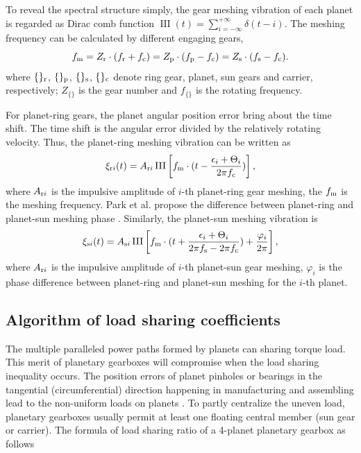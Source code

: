 \documentclass[a4paper,fleqn]{cas-sc}%
\begin{document}
\par To reveal the spectral structure simply, the gear meshing vibration of each planet is regarded as Dirac comb function $\operatorname{III}(t)=\sum_{i=-\infty}^{+\infty}\delta(t-i)$. The meshing frequency can be calculated by different engaging gears,
\begin{equation}
    f_{\rm m}=Z_{\rm r} \cdot (f_{\rm r}+f_{\rm c})=Z_{\rm p} \cdot (f_{\rm p}-f_{\rm c})=Z_{\rm s} \cdot (f_{\rm s}-f_{\rm c}). \label{eq:meshing_frequency}
\end{equation}
where $\{\}_{\rm r}$, $\{\}_{\rm p}$, $\{\}_{\rm s}$, $\{\}_{\rm c}$ denote ring gear, planet, sun gears and carrier, respectively; $Z_{\{\}}$ is the gear number and $f_{\{\}}$ is the rotating frequency. 
\par For planet-ring gears, the planet angular position error bring about the time shift. The time shift is the angular error divided by the relatively rotating velocity. Thus, the planet-ring meshing vibration can be written as
\begin{equation}
    \xi_{{\rm r}i}(t)=A_{{\rm r}i}\operatorname{III}\left[f_{\rm m} \cdot (t-\frac{\epsilon_i+\Theta_i}{2 \pi f_{\rm c}})\right],\label{eq:planet-ring_meshing}
\end{equation}
where $A_{{\rm r}i}$ is the impulsive amplitude of $i$-th planet-ring gear meshing, the $f_{\rm m}$ is the meshing frequency. Park et al. propose the difference between planet-ring and planet-sun meshing phase \cite{Parker2004}. Similarly, the planet-sun meshing vibration is
\begin{equation}
    \xi_{{\rm s}i}(t)=A_{{\rm s}i} \operatorname{III}\left[f_{\rm m} \cdot (t + \frac{\epsilon_i+\Theta_i}{2 \pi f_{\rm s}- 2 \pi f_{\rm c}})+ \frac{\varphi_i}{2 \pi} \right],\label{eq:planet-sun_meshing}
\end{equation}
where $A_{{\rm r}i}$ is the impulsive amplitude of $i$-th planet-sun gear meshing, $\varphi_i$ is the phase difference between planet-ring and planet-sun meshing for the $i$-th planet.
\subsection{Algorithm of load sharing coefficients\label{sec:algorithm_load_sharing}}
\par The multiple paralleled power paths formed by planets can sharing torque load. This merit of planetary gearboxes will compromise when the load sharing inequality occurs. The position errors of planet pinholes or bearings in the tangential (circumferential) direction happening in manufacturing and assembling lead to the non-uniform loads on planets \cite{Singh2010511-530}. To partly centralize the uneven load, planetary gearboxes usually permit at least one floating central member (sun gear or carrier). The formula of load sharing ratio of a 4-planet planetary gearbox as follows \cite{Ligata2009}
\end{document}
